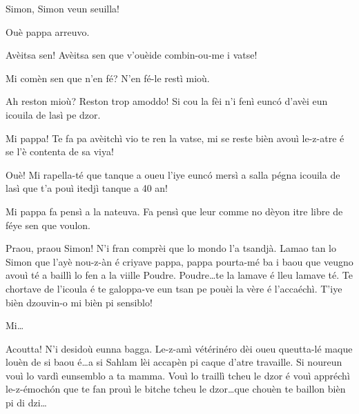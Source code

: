 \begin{drama}

\Cienspeaks Simon, Simon veun seuilla!

\Simonspeaks Ouè pappa arreuvo.

\Cienspeaks Avèitsa sen! Avèitsa sen que v'ouèide combin-ou-me i vatse!

\Simonspeaks Mi comèn sen que n’en fé? N’en fé-le restì mioù. 

\Cienspeaks Ah reston mioù? Reston trop amoddo! Si cou la fèi n'i fenì eunc\'o d'avèi eun icouila de lasì pe dzor. 

\Simonspeaks Mi pappa! Te fa pa avèitchì vio te ren la vatse, mi se reste bièn avouì le-z-atre é se l’è contenta de sa viya!

\Cienspeaks Ouè! Mi rapella-té que tanque a oueu l'iye eunc\'o mersì a salla pégna icouila de lasì que t'a pouì itedjì tanque a 40 an! 

\Simonspeaks{} Mi pappa fa pensì a la nateuva. Fa pensì que leur comme no dèyon itre libre de féye sen que voulon.

\Cienspeaks Praou, praou Simon! N’i fran comprèi que lo mondo l’a tsandjà. Lamao tan lo Simon que l’ayè nou-z-àn é criyave \og pap\-pa, pappa pourta-mé ba i baou que veugno avouì té a baillì lo fen a la viille Poudre\fg. Poudre\ldots te la lamave é lleu lamave té. Te chortave de l’icoula é te galoppa-ve eun tsan pe pouèi la vère é l’accaéchì. T'iye bièn dzouvin-o mi bièn pi sensiblo!

\Simonspeaks Mi\ldots

\Cienspeaks Acoutta! N’i desidoù eunna bagga. Le-z-amì vétérinéro dèi oueu queutta-lé maque louèn de si baou é\ldots a si Sahlam lèi accapèn pi caque d’atre travaille. Si noureun vouì lo vardì  eunsemblo a ta mamma. Vouì lo traillì tcheu le dzor é vouì appréchì le-z-émoch\'on que te fan prouì le bitche tcheu le dzor\ldots que chouèn te baillon bièn pi di dzi\ldots

\ridocliou

\DeriLeRido
{}

\end{drama}